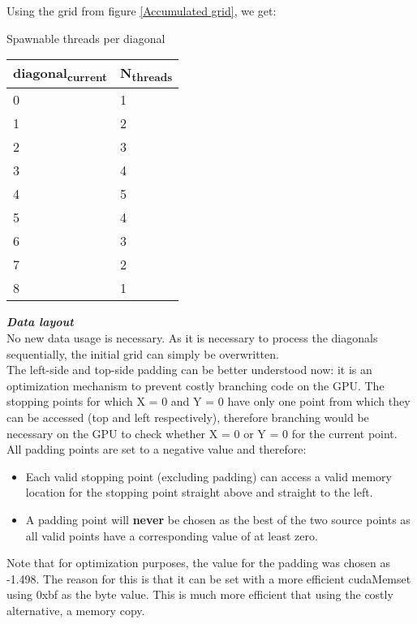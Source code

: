 \documentclass[11pt]{IEEEtran}
\begin{document}
Using the grid from figure \ref{Accumulated grid}, we get: 
  \begin{center}	
   {Spawnable threads per diagonal}
    \begin{tabular}{|p{3cm}|p{3cm}|}
    \hline
    \textbf{diagonal\textsubscript{current}}  & \textbf{N\textsubscript{threads}}\\
    \hline
    0 & 1\\
    \hline
    1 & 2 \\
	\hline
    2 & 3 \\
	\hline
    3 & 4 \\
	\hline
    4 & 5 \\
	\hline
    5 & 4 \\
	\hline
    6 & 3 \\
	\hline
    7 & 2 \\
	\hline
    8 & 1 \\
    \hline 
	\end{tabular}
  \end{center}
\textit{\textbf{Data layout}}\\[1\baselineskip] 
No new data usage is necessary. As it is necessary to process the diagonals sequentially, the initial grid can simply be overwritten.\\ The left-side and top-side padding can be better understood now: it is an optimization mechanism to prevent costly branching code on the GPU. The stopping points for which X = 0 and Y = 0 have only one point from which they can be accessed (top and left respectively), therefore branching would be necessary on the GPU to check whether X = 0 or Y = 0 for the current point. All padding points are set to a negative value and therefore:
\begin{itemize}
\item Each valid stopping point (excluding padding) can access a valid memory location for the stopping point straight above and straight to the left.
\item A padding point will \textbf{never} be chosen as the best of the two source points as all valid points have a corresponding value of at least zero.\\ 
\end{itemize}
Note that for optimization purposes, the value for the padding was chosen as -1.498. The reason for this is that it can be set with a more efficient cudaMemset using 0xbf as the byte value. This is much more efficient that using the costly alternative, a memory copy. 
\end{document}
